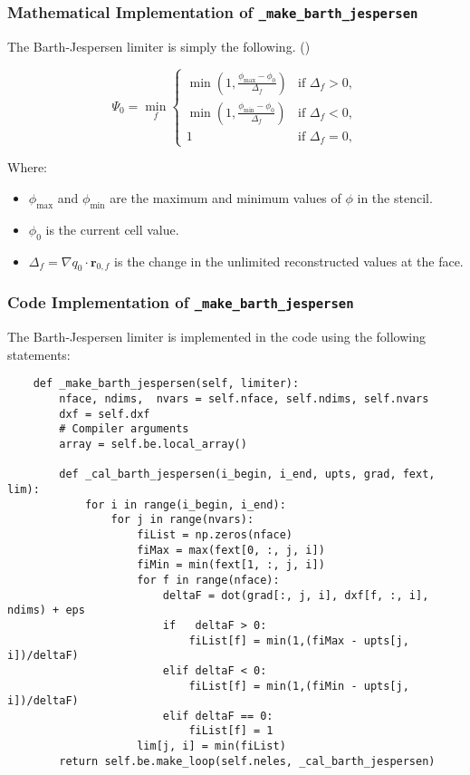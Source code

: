 \documentclass[a4paper, 12pt]{article}
\begin{document}
\subsubsection{Mathematical Implementation of \texttt{\_make\_barth\_jespersen}}

The Barth-Jespersen limiter is simply the following. (\cite{lect})

\begin{equation}
\Psi_0 = \min_f 
\begin{cases} 
\min \left(1, \frac{\phi_{\text{max}} - \phi_0}{\Delta_f} \right) & \text{if } \Delta_f > 0, \\
\min \left(1, \frac{\phi_{\text{min}} - \phi_0}{\Delta_f} \right) & \text{if } \Delta_f < 0, \\
1 & \text{if } \Delta_f = 0,
\end{cases}
\end{equation} \par

Where:
\begin{itemize}
    \item $\phi_{\text{max}}$ and $\phi_{\text{min}}$ are the maximum and minimum values of $\phi$ in the stencil.
    \item $\phi_0$ is the current cell value.
    \item $\Delta_f = \nabla q_0 \cdot \mathbf{r}_{0,f}$ is the change in the unlimited reconstructed values at the face.
\end{itemize}

\subsubsection{Code Implementation of \texttt{\_make\_barth\_jespersen}}
The Barth-Jespersen limiter is implemented in the code using the following statements:

\begin{verbatim}
    def _make_barth_jespersen(self, limiter):
        nface, ndims,  nvars = self.nface, self.ndims, self.nvars
        dxf = self.dxf
        # Compiler arguments
        array = self.be.local_array()
        
        def _cal_barth_jespersen(i_begin, i_end, upts, grad, fext, lim):
            for i in range(i_begin, i_end):
                for j in range(nvars):
                    fiList = np.zeros(nface)
                    fiMax = max(fext[0, :, j, i])
                    fiMin = min(fext[1, :, j, i])
                    for f in range(nface):
                        deltaF = dot(grad[:, j, i], dxf[f, :, i], ndims) + eps
                        if   deltaF > 0:
                            fiList[f] = min(1,(fiMax - upts[j, i])/deltaF)
                        elif deltaF < 0:
                            fiList[f] = min(1,(fiMin - upts[j, i])/deltaF)
                        elif deltaF == 0:
                            fiList[f] = 1
                    lim[j, i] = min(fiList)
        return self.be.make_loop(self.neles, _cal_barth_jespersen)
\end{verbatim} 
\par
\end{document}
